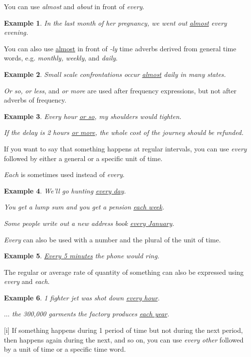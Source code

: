 \documentclass[oneside]{book}
\numberwithin{equation}{section}
\newtheorem{example}{Example}[section]
\begin{document}
%
You can use \textit{almost} and \textit{about} in front of \textit{every}.
\begin{example}
    In the last month of her pregnancy, we went out \underline{almost} every evening.
\end{example}
You can also use \underline{almost} in front of \textit{-ly} time adverbs derived from general time words, e.g. \textit{monthly, weekly}, and \textit{daily}.
\begin{example}
    Small scale confrontations occur \underline{almost} daily in many states.
\end{example}
\textit{Or so, or less}, and \textit{or more} are used after frequency expressions, but not after adverbs of frequency.
\begin{example}
    Every hour \underline{or so}, my shoulders would tighten.
    
    If the delay is 2 hours \underline{or more}, the whole cost of the journey should be refunded.
\end{example}
%
\noindent{} If you want to say that something happens at regular intervals, you can use \textit{every} followed by either a general or a specific unit of time.

\textit{Each} is sometimes used instead of \textit{every}.
\begin{example}
    We'll go hunting \underline{every day}.
    
    You get a lump sum and you get a pension \underline{each week}.
    
    Some people write out a new address book \underline{every January}.
\end{example}
\textit{Every} can also be used with a number and the plural of the unit of time.
\begin{example}
    \underline{Every 5 minutes} the phone would ring.
\end{example}
The regular or average rate of quantity of something can also be expressed using \textit{every} and \textit{each}.
\begin{example}
    1 fighter jet was shot down \underline{every hour}.
    
    $\ldots$ the 300,000 garments the factory produces \underline{each year}.
\end{example}
%
\noindent{} [i] If something happens during 1 period of time but not during the next period, then happens again during the next, and so on, you can use \textit{every other} followed by a unit of time or a specific time word.
\end{document}
